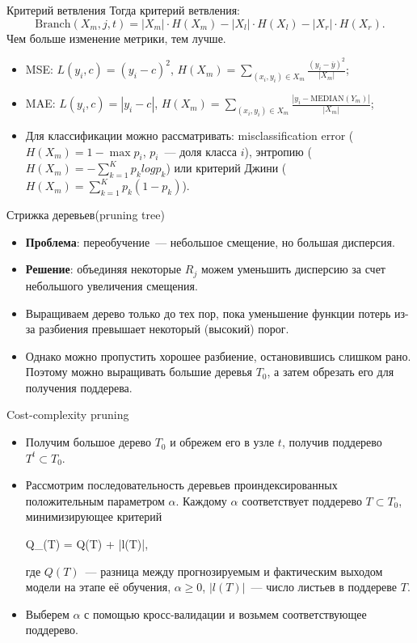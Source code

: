 \documentclass[notheorems, handout]{beamer}
\begin{document}
\begin{frame}{Критерий ветвления}
	Тогда критерий ветвления:
	\[
	\mathrm{Branch} (X _m, j, t) = |X _m| \cdot H(X _m) - |X _l| \cdot H(X _l) - |X _r| \cdot H(X _r).
	\]
	Чем больше изменение метрики, тем лучше.

	\begin{itemize}
		\item MSE: $L (y _i, c) = (y _i - c) ^2$, $H (X _m) = \sum \limits _{(x _i, y _i) \in X _m} \frac {(y _i - \overline{y}) ^2} {|X _m|}$;
		\item MAE: $L (y _i, c) = |y _i - c|$, $H (X _m) = \sum \limits _{(x _i, y _i) \in X _m} \frac {|y _i - \mathrm{MEDIAN}(Y _m)|} {|X _m|}$;
		\item Для классификации можно рассматривать: misclassification error ($H (X _m) = 1 - \max p _i$, $p _i$~--- доля класса $i$), энтропию ($H (X _m) = - \sum ^K _{k = 1} p _k log p_k$) или критерий Джини ($H (X _m) = \sum ^K _{k = 1} p _k (1 - p_k)$).
	\end{itemize}
\end{frame}

\begin{frame}{Стрижка деревьев(pruning tree)}
\begin{itemize}
	\item \textbf{Проблема}: переобучение~--- небольшое смещение, но большая дисперсия.
	\item \textbf{Решение}: объединяя некоторые $R_{j}$ можем уменьшить дисперсию за счет небольшого увеличения смещения.
	\item Выращиваем дерево только до тех пор, пока уменьшение функции потерь из-за разбиения превышает некоторый (высокий) порог.
	\item Однако можно пропустить хорошее разбиение, остановившись слишком рано. Поэтому можно выращивать большие деревья $T_{0}$, а затем обрезать его для получения поддерева.
\end{itemize}
\end{frame}

\begin{frame}{Cost-complexity pruning}
\begin{itemize}
	\item Получим большое дерево $T_{0}$ и обрежем его в узле $t$, получив поддерево $T^{t} \subset T_{0}$.
	\item Рассмотрим последовательность деревьев проиндексированных положительным параметром $\alpha$. Каждому $\alpha$ соответствует поддерево $T \subset T_{0}$, минимизирующее критерий
		\begin{flalign*}
			Q_{\alpha}(T) = Q(T) + \alpha |l(T)|,
		\end{flalign*}
где $Q(T)$~--- разница между прогнозируемым и фактическим выходом модели на этапе её обучения, $\alpha \geq 0$, $|l(T)|$~--- число листьев в поддереве $T$. 
	\item Выберем $\alpha$ с помощью кросс-валидации и возьмем соответствующее поддерево.
\end{itemize}
\end{frame}
\end{document}

